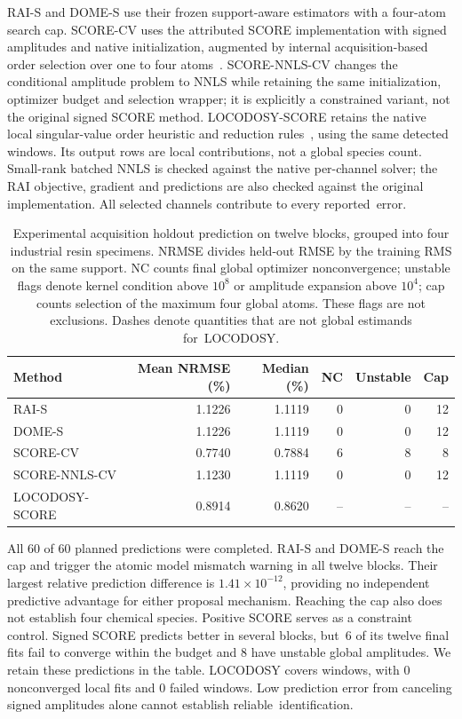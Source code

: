 \documentclass[mathematics,article,accept,moreauthors]{Definitions/mdpi}
\begin{document}
RAI-S and DOME-S use their frozen support-aware estimators with a four-atom search cap. SCORE-CV uses the attributed SCORE implementation with signed amplitudes and native initialization, augmented by internal acquisition-based order selection over one to four atoms~\cite{score}. SCORE-NNLS-CV changes the conditional amplitude problem to NNLS while retaining the same initialization, optimizer budget and selection wrapper; it is explicitly a constrained variant, not the original signed SCORE method. LOCODOSY-SCORE retains the native local singular-value order heuristic and reduction rules~\cite{locodosy}, using the same detected windows. Its output rows are local contributions, not a global species count. Small-rank batched NNLS is checked against the native per-channel solver; the RAI objective, gradient and predictions are also checked against the original implementation. All selected channels contribute to every reported~error.

\begin{table}[H]
\caption{Experimental 
 acquisition holdout prediction on twelve blocks, grouped into four industrial resin specimens. NRMSE divides held-out RMSE by the training RMS on the same support. NC counts final global optimizer nonconvergence; unstable flags denote kernel condition above $10^8$ or amplitude expansion above $10^4$; cap counts selection of the maximum four global atoms. These flags are not exclusions. Dashes denote quantities that are not global estimands for~LOCODOSY.}\label{tab:experimentalrevision}
\centering\small
\begin{tabularx}{\textwidth}{LRRRRR}\toprule
\textbf{Method} & \textbf{Mean NRMSE (\%)} & \textbf{Median (\%) }& \textbf{NC} & \textbf{Unstable} & \textbf{Cap}\\\midrule
RAI-S & 1.1226 & 1.1119 & 0 & 0 & 12\\
DOME-S & 1.1226 & 1.1119 & 0 & 0 & 12\\
SCORE-CV & 0.7740 & 0.7884 & 6 & 8 & 8\\
SCORE-NNLS-CV & 1.1230 & 1.1119 & 0 & 0 & 12\\
LOCODOSY-SCORE & 0.8914 & 0.8620 & -- & -- & --\\
\bottomrule\end{tabularx}
\end{table}

All 60 of 60 planned predictions were completed. RAI-S and DOME-S reach the cap
and trigger the atomic model mismatch warning in all twelve blocks. Their largest
relative prediction difference is $1.41\times10^{-12}$, providing no independent
predictive advantage for either proposal mechanism. Reaching the cap also does
not establish four chemical species. Positive SCORE serves as a constraint
control. Signed SCORE predicts better in several blocks, but~6 of its twelve
final fits fail to converge within the budget and 8 have unstable global
amplitudes. We retain these predictions in the table. LOCODOSY covers windows,
with 0 nonconverged local fits and 0 failed windows. Low prediction error from
canceling signed amplitudes alone cannot establish reliable~identification.
\end{document}
